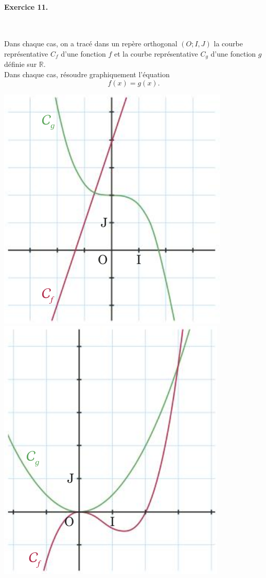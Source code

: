 \documentclass[11pt]{article}
\begin{document}
\paragraph{Exercice 11.}~\\[-5mm]
\begin{minipage}{.4\textwidth}
  Dans chaque cas, on a tracé dans un repère orthogonal $(O; I, J)$ la courbe
  représentative $C_f$ d'une fonction $f$ et la courbe représentative $C_g$
  d'une fonction $g$ définie sur $\mathbb{R}$.\\
  Dans chaque cas, résoudre graphiquement l'équation
  \[
    f(x)=g(x).
  \]
\end{minipage}
\begin{minipage}{.6\textwidth}
  \begin{center}
\includegraphics[scale=.3]{courbes2.png}
\includegraphics[scale=.3]{courbes1.png}
  \end{center}
\end{minipage}
\end{document}
